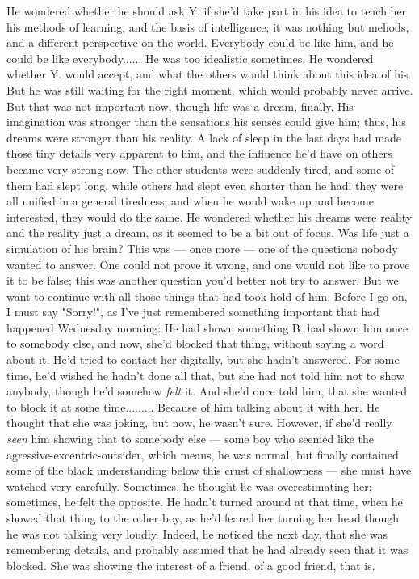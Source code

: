 He wondered whether he should ask Y. if she'd take part in his idea to teach her his methods of learning, and the basis of intelligence; it was nothing but mehods, and a different perspective on the world. Everybody could be like him, and he could be like everybody......
He was too idealistic sometimes. He wondered whether Y. would accept, and what the others would think about this idea of his. But he was still waiting for the right moment, which would probably never arrive. 
But that was not important now, though life was a dream, finally. 
His imagination was stronger than the sensations his senses could give him; thus, his dreams were stronger than his reality. A lack of sleep in the last days had made those tiny details very apparent to him, and the influence he'd have on others became  very strong now. The other students were suddenly tired, and some of them had slept long, while others had slept even shorter than he had; they were all unified in a general tiredness, and when he would wake up and become interested, they would do the same. He wondered whether his dreams were reality and the reality just a dream, as it seemed to be a bit out of focus. Was life just a simulation of his brain? This was --- once more --- one of the questions nobody wanted to answer. One could not prove it wrong, and one would not like to prove it to be false; this was another question you'd better not try to answer. 
But we want to continue with all those things that had took hold of him. 
Before I go on, I must say "Sorry!", as I've just remembered something important that had happened Wednesday morning: He had shown something B. had shown him once to somebody else, and now, she'd blocked that thing, without saying a word about it. He'd tried to contact her digitally, but she hadn't answered. For some time, he'd wished he hadn't done all that, but she had not told him not to show anybody, though he'd somehow \emph{felt} it. And she'd once told him, that she wanted to block it at some time.........
Because of him talking about it with her. He thought that she was joking, but now, he wasn't sure. However, if she'd really \emph{seen} him showing that to somebody else --- some boy who seemed like the agressive-excentric-outsider, which means, he was normal, but finally contained some of the black understanding below this crust of shallowness --- she must have watched very carefully. 
Sometimes, he thought he was overestimating her; sometimes, he felt the opposite. He hadn't turned around at that time, when he showed that thing to the other boy, as he'd feared her turning her head though he was not talking very loudly. Indeed, he noticed the next day, that she was remembering details, and probably assumed that he had already seen that it was blocked. She was showing the interest of a friend, of a good friend, that is. 
